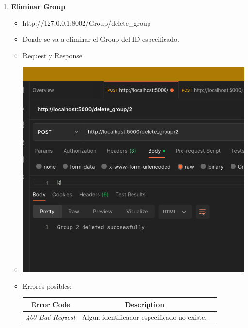 \documentclass{article}
\begin{document}
\begin{enumerate}
    \item \textbf{Eliminar Group}
    \begin{itemize}
        \item http://127.0.0.1:8002/Group/delete\_group
        \item Donde se va a eliminar el Group del ID especificado.
        \item Request y Response:
        \item \includegraphics[scale=.5]{assets/group/delete.png}
        \item Errores posibles:
        \begin{table}[H] \centering \begin{tabular}{|c|c|l|} \hline \textbf{Error
        Code} & \textbf{Description} \\ \hline \textit{400 Bad Request} & Algun
        identificador especificado no existe. \\ \hline \end{tabular}
        \end{table}
    \end{itemize}
\end{enumerate}
\end{document}
